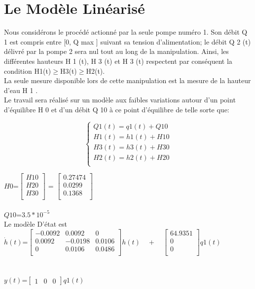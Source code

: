  \section{Le Modèle Linéarisé }
 
      Nous considérons le procédé actionné par la seule pompe numéro 1. Son débit Q 1 est compris entre [0, Q max ] suivant sa tension d’alimentation; le débit Q 2 (t) délivré par la pompe 2 sera nul tout au long de la manipulation. Ainsi, les différentes hauteurs H 1 (t), H 3 (t) et H 3 (t) respectent par conséquent la condition H{1}(t)$\geq$H{3}(t)$\geq$H{2}(t).\\ 
      La seule mesure disponible lors de cette manipulation est la mesure de la hauteur d’eau H 1 .\\
      
      Le travail sera réalisé sur un modèle aux faibles variations autour d’un point d’équilibre H 0 et d’un débit Q 10 à ce point d’équilibre de telle sorte que:

\begin{equation}
\left\{\begin{matrix}
Q1(t)=q1(t) +Q10\\
H{1}(t)=h{1}(t) +H{10}\\
H{3}(t)=h{3}(t) +H{30}\\
H{2}(t)=h{2}(t) +H{20}\\
\end{matrix}\right.
\end{equation} 


$H{0}$=$\begin{bmatrix}
H{10}\\
H{20}\\
H{30}\\
\end{bmatrix}$
\quad=\quad
$\begin{bmatrix}
0.27474\\
0.0299\\
0.1368\\
\end{bmatrix}$\\\\

$Q{10}$=$3.5*10^{-5}$\\

Le modèle D’état est\\


$\dot{h}(t)$=$\begin{bmatrix}
-0.0092 & 0.0092 & 0 \\
0.0092 & -0.0198 & 0.0106\\
0 & 0.0106 & 0.0486\\
\end{bmatrix}h(t)
\quad+\quad
\begin{bmatrix}
64.9351\\
0\\
0\\
\end{bmatrix}q1(t)$\\\\\\
$y(t)$=$\begin{bmatrix}
1 & 0 & 0
\end{bmatrix}q1(t)$\\

 

